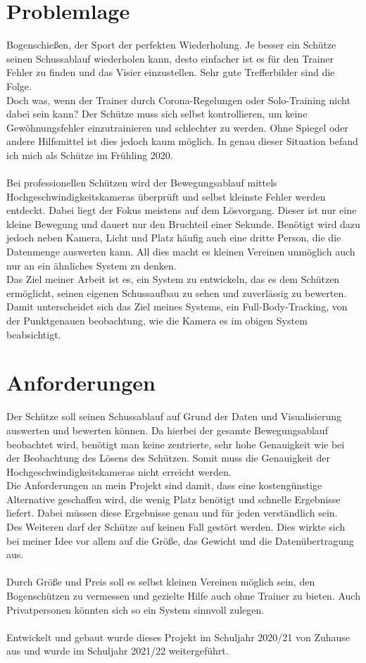 \section{Problemlage}
Bogenschießen, der Sport der perfekten Wiederholung. Je besser ein Schütze seinen Schussablauf wiederholen kann, 
desto einfacher ist es für den Trainer Fehler zu finden und das Visier einzustellen. Sehr gute Trefferbilder sind 
die Folge.\\
Doch was, wenn der Trainer durch Corona-Regelungen oder Solo-Training nicht dabei sein kann? Der Schütze muss sich
selbst kontrollieren, um keine Gewöhnungsfehler einzutrainieren und schlechter zu werden. Ohne Spiegel oder andere 
Hilfsmittel ist dies jedoch kaum möglich. In genau dieser Situation befand ich mich als Schütze im Frühling 2020.\\ 
\\
Bei professionellen Schützen wird der Bewegungsablauf mittels Hochgeschwindigkeitskameras überprüft und selbst kleinste
Fehler werden entdeckt. Dabei liegt der Fokus meistens auf dem Lösvorgang. Dieser ist nur eine kleine Bewegung und 
dauert nur den Bruchteil einer Sekunde.
Benötigt wird dazu jedoch neben Kamera, Licht und Platz häufig auch eine dritte Person, die die
Datenmenge auswerten kann. All dies macht es kleinen Vereinen unmöglich auch nur an ein ähnliches System zu denken.\\
Das Ziel meiner Arbeit ist es, ein System zu entwickeln, das es dem Schützen ermöglicht, seinen eigenen Schussaufbau 
zu sehen und zuverlässig zu bewerten. Damit unterscheidet sich das Ziel meines Systems, ein Full-Body-Tracking, von der
Punktgenauen beobachtung, wie die Kamera es im obigen System beabsichtigt.

\section{Anforderungen}
Der Schütze soll seinen Schussablauf auf Grund der Daten und Visualisierung auswerten und bewerten können.
Da hierbei der gesamte Bewegungsablauf beobachtet wird, benötigt man keine zentrierte, sehr hohe Genauigkeit wie bei der 
Beobachtung des Lösens des Schützen. Somit muss die Genauigkeit der Hochgeschwindigkeitskameras nicht erreicht werden.
\\
Die Anforderungen an mein Projekt sind damit, dass eine kostengünstige Alternative 
geschaffen wird, die wenig Platz benötigt und schnelle Ergebnisse liefert. Dabei müssen diese 
Ergebnisse genau und für jeden verständlich sein.\\
Des Weiteren darf der Schütze auf keinen Fall gestört werden.
Dies wirkte sich bei meiner Idee vor allem auf die Größe, das Gewicht und die 
Datenübertragung aus.\\
\\
Durch Größe und Preis soll es selbst kleinen Vereinen möglich sein, den Bogenschützen zu vermessen und gezielte Hilfe
auch ohne Trainer zu bieten. Auch Privatpersonen könnten sich so ein System sinnvoll zulegen.\\
\\
Entwickelt und gebaut wurde dieses Projekt im Schuljahr 2020/21 von Zuhause aus und wurde 
im Schuljahr 2021/22 weitergeführt.

